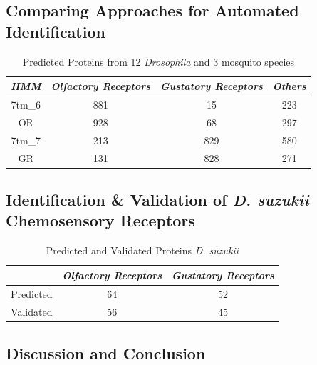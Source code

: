 \subsection{Comparing Approaches for Automated Identification}

\begin{table}[H]
  \centering
  \begin{tabular}{c c c c} \hline
  \emph{HMM} & \emph{Olfactory Receptors} & \emph{Gustatory Receptors} & \emph{Others} \\ \hline
  7tm\_6 & 881 & 15 & 223 \\ \hline
  OR & 928 & 68 & 297 \\ \hline
  7tm\_7 & 213 & 829 & 580 \\ \hline
  GR & 131 & 828 & 271 \\ \hline
  \end{tabular}
  \caption{Predicted Proteins from 12 \textit{Drosophila} and 3 mosquito species}
  \label{tab:chemosensory:hmm-validation}
\end{table}

\subsection{Identification \& Validation of \emph{D. suzukii} Chemosensory Receptors}

\begin{table}[H]
  \centering
  \begin{tabular}{c c c} \hline
  & \emph{Olfactory Receptors} & \emph{Gustatory Receptors} \\ \hline
  Predicted & 64 & 52 \\ \hline
  Validated & 56 & 45 \\ \hline 
  \end{tabular}
  \caption{Predicted and Validated Proteins \emph{D. suzukii}}
  \label{tab:chemosensory:suzukii-predictions}
\end{table}

\subsection{Discussion and Conclusion}
